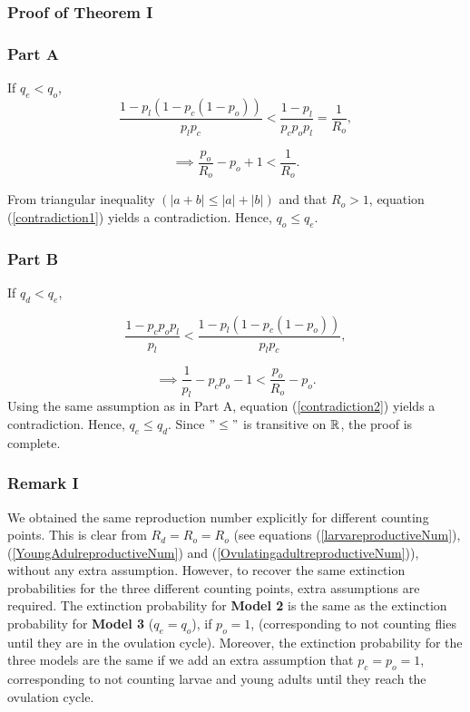 \subsubsection{Proof of Theorem I}
\subsubsection{Part A}
If  $q_{e} < q_{o}$, %
$$ \frac{1- p_{l}(1 -p_{c}(1- p_{o}))}{p_{l}p_{c}} < \frac{1-p_{l}}{p_{c}p_{o}p_{l}} = \frac{1}{R_{o}}, $$

\begin{equation}
\label{contradiction1}
\implies       \frac{p_{o}}{R_{o}} - p_{o} + 1 < \frac{1}{R_{o}}. 
\end{equation}

From triangular inequality $( |a + b| \leq |a| + |b|)$ and  that $R_{o} > 1$, equation (\ref{contradiction1}) yields a contradiction. Hence, $q_{o} \leq q_{e}$. 
\subsubsection{Part B}
If $q_{d} < q_{e}$,

$$  \frac{1-p_{c}p_{o}p_{l}}{p_{l}}  < \frac{1- p_{l}(1 -p_{c}(1- p_{o}))}{p_{l}p_{c}},  $$

\begin{equation}
\label{contradiction2}
\implies  \frac{1}{p_{l}} - p_{c}p_{o} - 1 <     \frac{p_{o}}{R_{o}} - p_{o}.
\end{equation}
Using the same assumption as in Part A, equation (\ref{contradiction2}) yields a contradiction. Hence, $q_{e} \leq q_{d}$. Since $"\leq"$ is transitive on ${\Bbb R}$, the proof is complete.

\subsubsection*{\bf Remark I}
We obtained the same reproduction number explicitly for different counting points. This is clear from  $R_{d} = R_{o}=R_{o}$ (see equations (\ref{larvareproductiveNum}), (\ref{YoungAdulreproductiveNum}) and (\ref{OvulatingadultreproductiveNum})), without any extra assumption. However, to recover the same extinction probabilities for the three different counting points, extra assumptions are required. The extinction probability for {\bf Model 2} is the same as the extinction probability for {\bf Model 3} ($q_{e} =q_{o}$), if $p_{o} = 1$, (corresponding to not counting flies until they are in the ovulation cycle). Moreover, the extinction probability for the three models are the same if we add an extra assumption that $p_{c} =p_{o} = 1$, corresponding to not counting larvae and young adults until they reach the ovulation cycle. \\


